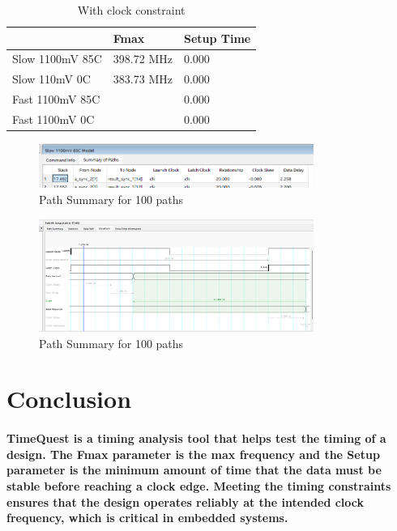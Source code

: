 \documentclass{article}
\begin{document}
\begin{table}[h!]
    \centering
    \begin{tabular}{|p{3cm}|p{3cm}|p{3cm}|}%
        \hline
         & Fmax & Setup Time \\ \hline
         Slow 1100mV 85C & 398.72 MHz & 0.000 \\ \hline %
         Slow 110mV 0C & 383.73 MHz & 0.000 \\ \hline
         Fast 1100mV 85C  & & 0.000 \\ \hline
         Fast 1100mV 0C & & 0.000 \\ \hline
    \end{tabular}
    \caption{With clock constraint}
\end{table}

\begin{figure}[!htbp]
    \centering
    \includegraphics[width=0.8\textwidth]{PathSummary2.png}
    \caption{Path Summary for 100 paths}
    \label{fig:PathSummary2}
\end{figure}

\begin{figure}[H]
    \centering
    \includegraphics[width=0.8\textwidth]{PathWaveForm.png}
    \caption{Path Summary for 100 paths}
    \label{fig:Waveform}
\end{figure}

\section*{Conclusion}
\paragraph{TimeQuest is a timing analysis tool that helps test the timing of a design. The Fmax parameter is the max frequency and the Setup parameter is the minimum amount of time that the data must be stable before reaching a clock edge. Meeting the timing constraints ensures that the design operates reliably at the intended clock frequency, which is critical in embedded systems.}
\end{document}
